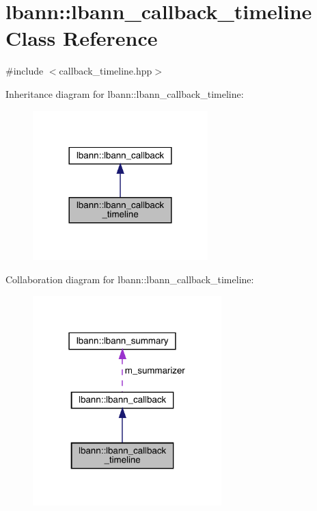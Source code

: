 \hypertarget{classlbann_1_1lbann__callback__timeline}{}\section{lbann\+:\+:lbann\+\_\+callback\+\_\+timeline Class Reference}
\label{classlbann_1_1lbann__callback__timeline}


{\ttfamily \#include $<$callback\+\_\+timeline.\+hpp$>$}



Inheritance diagram for lbann\+:\+:lbann\+\_\+callback\+\_\+timeline\+:\nopagebreak
\begin{figure}[H]
\begin{center}
\leavevmode
\includegraphics[width=192pt]{classlbann_1_1lbann__callback__timeline__inherit__graph}
\end{center}
\end{figure}


Collaboration diagram for lbann\+:\+:lbann\+\_\+callback\+\_\+timeline\+:\nopagebreak
\begin{figure}[H]
\begin{center}
\leavevmode
\includegraphics[width=207pt]{classlbann_1_1lbann__callback__timeline__coll__graph}
\end{center}
\end{figure}
